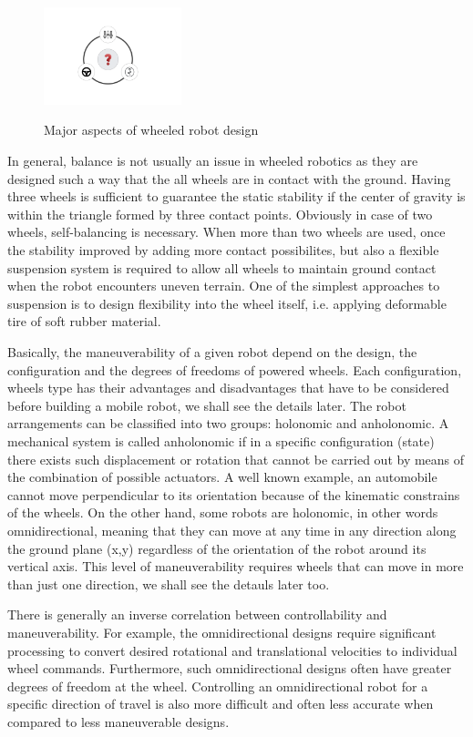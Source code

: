 \documentclass[12pt,english]{article}
\begin{document}
\begin{figure}[h]
	\centering
	\includegraphics[width=4cm]{figures/triangle.pdf}
	\label{triangle}
	\caption{Major aspects of wheeled robot design}
\end{figure}

In general, balance is not usually an issue in wheeled robotics as they are designed such a way that the all wheels are in contact with the ground. Having three wheels is sufficient to guarantee the static stability if the center of gravity is within the triangle formed by three contact points. Obviously in case of two wheels, self-balancing is necessary. When more than two wheels are used, once the stability improved by adding more contact possibilites, but also a flexible suspension system is required to allow all wheels to maintain ground contact when the robot encounters uneven terrain. One of the simplest approaches to suspension is to design flexibility into the wheel itself, i.e. applying deformable tire of soft rubber material.

Basically, the maneuverability of a given robot depend on the design, the configuration and the degrees of freedoms of powered wheels. Each configuration, wheels type has their advantages and disadvantages that have to be considered before building a mobile robot, we shall see the details later. The robot arrangements can be classified into two groups: holonomic and anholonomic. A mechanical system is called anholonomic if in a specific configuration (state) there exists such displacement or rotation that cannot be carried out by means of the combination of possible actuators. A well known example, an automobile cannot move perpendicular to its orientation because of the kinematic constrains of the wheels. On the other hand, some robots are holonomic, in other words omnidirectional, meaning that they can move at any time in any direction along the ground plane (x,y) regardless of the orientation of the robot around its vertical axis. This level of maneuverability requires wheels that can move in more than just one direction, we shall see the detauls later too.

There is generally an inverse correlation between controllability and maneuverability. For example, the omnidirectional designs require significant processing to convert desired rotational and translational velocities to individual
wheel commands. Furthermore, such omnidirectional designs often have greater degrees of freedom at the wheel. Controlling an omnidirectional robot for a specific direction of travel is also more difficult and often less accurate when compared to less maneuverable designs.
\end{document}
